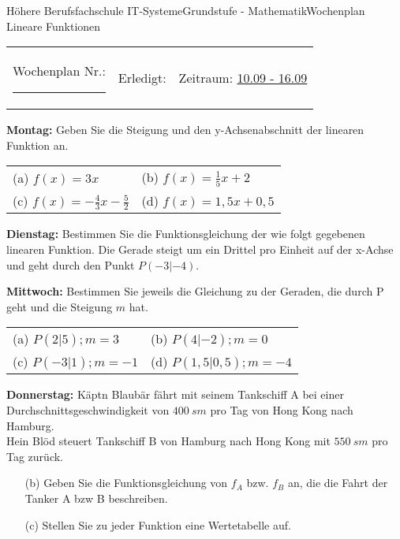 \documentclass[oneside,openany,headings=optiontotoc,11pt,numbers=noenddot]{scrreprt}
\begin{document}
	\begin{worksheet}{Höhere Berufsfachschule IT-Systeme}{Grundstufe - Mathematik}{Wochenplan Lineare Funktionen}
		\noindent
		\begin{tabularx}{\textwidth}{XXl}
			Wochenplan Nr.: \rule{0.15\textwidth}{1pt} & Erledigt: & Zeitraum: \underline{10.09 - 16.09}
		\end{tabularx}
	
		\begin{framed}
			\noindent
			\textbf{Montag:} Geben Sie die Steigung und den y-Achsenabschnitt der linearen Funktion an.\\
			\par\noindent
			\begin{tabularx}{\textwidth}{XX}
				(a) \(f(x) = 3x\) & (b) \(f(x) = \frac{1}{5}x +2\)\\
				(c) \(f(x) = -\frac{4}{3}x -\frac{5}{2}\) & (d) \(f(x) = 1,5x+0,5\)
			\end{tabularx}
		\end{framed}
		\begin{framed}
			\noindent
			\textbf{Dienstag:} Bestimmen Sie die Funktionsgleichung der wie folgt gegebenen linearen Funktion.
			\indent{} Die Gerade steigt um ein Drittel pro Einheit auf der x-Achse und geht durch den Punkt \(P(-3|-4)\).
		\end{framed}
		\begin{framed}
			\noindent
			\textbf{Mittwoch:} Bestimmen Sie jeweils die Gleichung zu der Geraden, die durch P geht und die Steigung \(m\) hat.\\
			\begin{tabularx}{\textwidth}{XX}
				(a) \(P(2|5); m=3\) & (b) \(P(4|-2); m=0\)\\
				(c) \(P(-3|1); m=-1\) & (d) \(P(1,5|0,5); m=-4\)
			\end{tabularx}
		\end{framed}
		\begin{framed}
			\noindent
			\textbf{Donnerstag:} Käpt\grq{}n Blaubär fährt mit seinem Tankschiff A bei einer Durchschnittsgeschwindigkeit von \(400\ sm\) pro Tag von Hong Kong nach Hamburg.\\
			Hein Blöd steuert Tankschiff B von Hamburg nach Hong Kong mit \(550\ sm\) pro Tag zurück.
			\begin{itemize}
				\item[(b)] Geben Sie die Funktionsgleichung von \(f_A\) bzw. \(f_B\) an, die die Fahrt der Tanker A bzw B beschreiben.
				\item[(c)] Stellen Sie zu jeder Funktion eine Wertetabelle auf.

\end{itemize}
\end{framed}
\end{worksheet}
\end{document}
